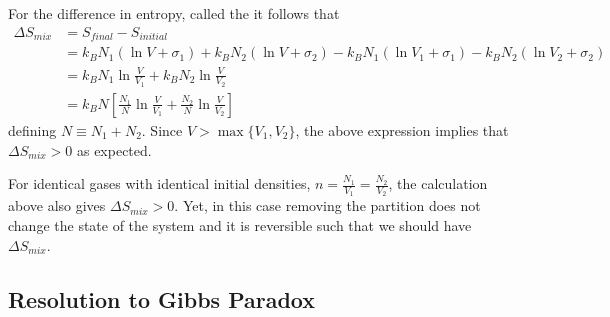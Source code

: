 \documentclass[12pt, a4paper, oneside, openright, titlepage]{book}
\begin{document}
For the difference in entropy, called the  it follows that \begin{align*}
    \Delta S_{mix} &= S_{final} - S_{initial} \\
    &= k_BN_1(\ln V + \sigma_1) + k_BN_2(\ln V +\sigma_2) - k_BN_1(\ln V_1 + \sigma_1) - k_BN_2(\ln V_2 +\sigma_2) \\
    &= k_BN_1\ln\frac{V}{V_1} + k_BN_2\ln\frac{V}{V_2} \\
    &= k_BN\left[\frac{N_1}{N}\ln\frac{V}{V_1} + \frac{N_2}{N}\ln\frac{V}{V_2}\right]
\end{align*}
defining $N \equiv N_1+N_2$. Since $V > \max\{V_1,V_2\}$, the above expression implies that $\Delta S_{mix} > 0$ as expected.

\begin{cust}
    For identical gases with identical initial densities, $n = \frac{N_1}{V_1} = \frac{N_2}{V_2}$, the calculation above also gives $\Delta S_{mix} > 0$. Yet, in this case removing the partition does not change the state of the system and it is reversible such that we should have $\Delta S_{mix}$.
\end{cust}

\subsection{Resolution to Gibbs Paradox}
\end{document}
